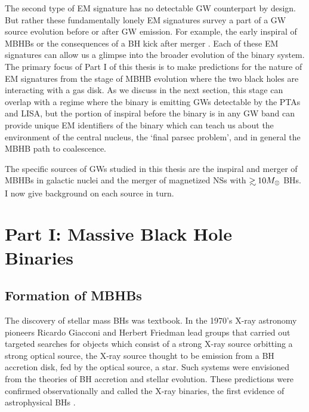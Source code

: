 The second type of EM signature has no detectable GW counterpart by design.
But rather these fundamentally lonely EM signatures survey a part of a GW
source evolution before or after GW emission. For example, the early
inspiral of MBHBs \citep{Haiman+2008, HKM09} or the consequences of a BH kick
after merger \citep{BHkicks_aftermerger}. Each of these EM signatures can allow us a
glimpse into the broader evolution of the binary system. The primary focus of
Part I of this thesis is to make predictions for the nature of EM signatures
from the stage of MBHB evolution where the two black holes are interacting
with a gas disk. As we discuss in the next section, this stage can overlap
with a regime where the binary is emitting GWs detectable by the PTAs and
LISA, but the portion of inspiral before the binary is in any GW band
can provide unique EM identifiers of the binary which can teach us about the
environment of the central nucleus, the `final parsec problem', and in general
the MBHB path to coalescence.

The specific sources of GWs studied in this thesis are the inspiral and merger
of MBHBs in galactic nuclei and the merger of magnetized NSs with $\gsim 10
\Msun$ BHs. I now give background on each source in turn.






\section{Part I: Massive Black Hole Binaries} 
\subsection{Formation of MBHBs}     

The discovery of stellar mass BHs was textbook. In
the 1970's X-ray astronomy pioneers Ricardo Giacconi and Herbert Friedman lead
groups that carried out targeted searches for objects which consist of a
strong X-ray source orbitting a strong optical source, the X-ray source
thought to be emission from a BH accretion disk, fed by the optical source, a
star. Such systems were envisioned from the theories of BH accretion and
stellar evolution. These predictions were confirmed observationally and called
the X-ray binaries, the first evidence of astrophysical BHs 
\citep[an entertaining historical account is found in][]{ThorneBHsTimeWarps:CH8}. 

